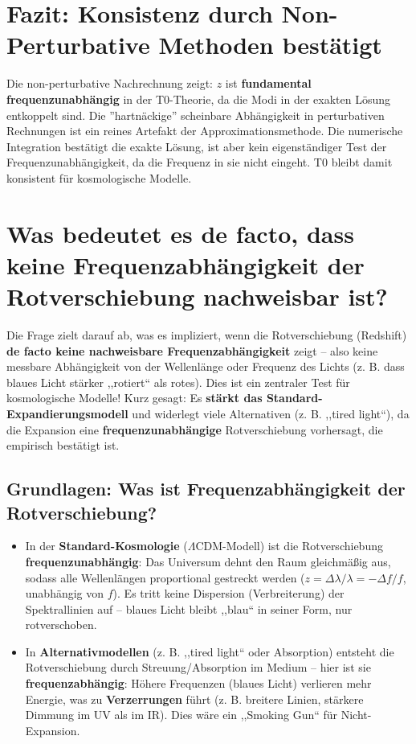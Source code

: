 	\section{Fazit: Konsistenz durch Non-Perturbative Methoden bestätigt}
	
	Die non-perturbative Nachrechnung zeigt: $z$ ist \textbf{fundamental frequenzunabhängig} in der T0-Theorie, da die Modi in der exakten Lösung entkoppelt sind. Die ''hartnäckige'' scheinbare Abhängigkeit in perturbativen Rechnungen ist ein reines Artefakt der Approximationsmethode. Die numerische Integration bestätigt die exakte Lösung, ist aber kein eigenständiger Test der Frequenzunabhängigkeit, da die Frequenz in sie nicht eingeht. T0 bleibt damit konsistent für kosmologische Modelle.
	
	\section{Was bedeutet es de facto, dass keine Frequenzabhängigkeit der Rotverschiebung nachweisbar ist?}
	
	Die Frage zielt darauf ab, was es impliziert, wenn die Rotverschiebung (Redshift) \textbf{de facto keine nachweisbare Frequenzabhängigkeit} zeigt – also keine messbare Abhängigkeit von der Wellenlänge oder Frequenz des Lichts (z. B. dass blaues Licht stärker ,,rotiert`` als rotes). Dies ist ein zentraler Test für kosmologische Modelle! Kurz gesagt: Es \textbf{stärkt das Standard-Expandierungsmodell} und widerlegt viele Alternativen (z. B. ,,tired light``), da die Expansion eine \textbf{frequenzunabhängige} Rotverschiebung vorhersagt, die empirisch bestätigt ist.
	
	\subsection{Grundlagen: Was ist Frequenzabhängigkeit der Rotverschiebung?}
	
	\begin{itemize}
		\item In der \textbf{Standard-Kosmologie} ($\Lambda$CDM-Modell) ist die Rotverschiebung \textbf{frequenzunabhängig}: Das Universum dehnt den Raum gleichmäßig aus, sodass alle Wellenlängen proportional gestreckt werden ($z = \Delta\lambda/\lambda = -\Delta f/f$, unabhängig von $f$). Es tritt keine Dispersion (Verbreiterung) der Spektrallinien auf – blaues Licht bleibt ,,blau`` in seiner Form, nur rotverschoben.
		\item In \textbf{Alternativmodellen} (z. B. ,,tired light`` oder Absorption) entsteht die Rotverschiebung durch Streuung/Absorption im Medium – hier ist sie \textbf{frequenzabhängig}: Höhere Frequenzen (blaues Licht) verlieren mehr Energie, was zu \textbf{Verzerrungen} führt (z. B. breitere Linien, stärkere Dimmung im UV als im IR). Dies wäre ein ,,Smoking Gun`` für Nicht-Expansion.
	\end{itemize}
	
